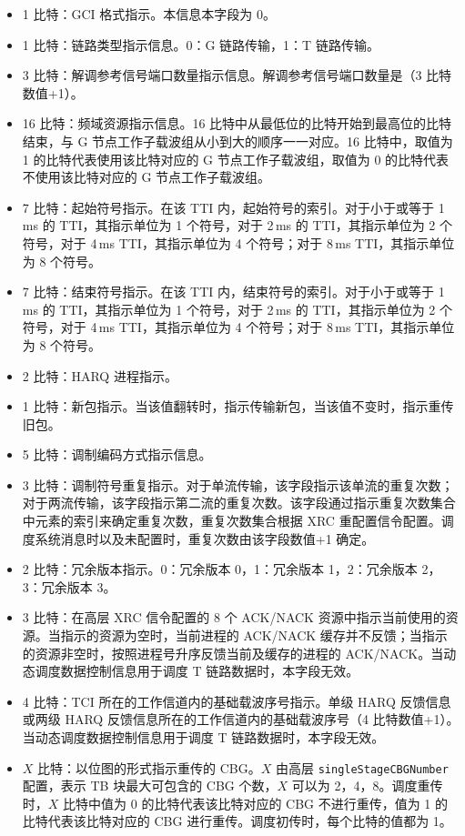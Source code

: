 \documentclass[11pt,a4paper]{ctexart}
\begin{document}
\begin{itemize}[nosep]
  \item 1 比特：GCI 格式指示。本信息本字段为 0。
  \item 1 比特：链路类型指示信息。0：G 链路传输，1：T 链路传输。
  \item 3 比特：解调参考信号端口数量指示信息。解调参考信号端口数量是（3 比特数值+1）。
  \item 16 比特：频域资源指示信息。16 比特中从最低位的比特开始到最高位的比特结束，与 G 节点工作子载波组从小到大的顺序一一对应。16 比特中，取值为 1 的比特代表使用该比特对应的 G 节点工作子载波组，取值为 0 的比特代表不使用该比特对应的 G 节点工作子载波组。
  \item 7 比特：起始符号指示。在该 TTI 内，起始符号的索引。对于小于或等于 1\,ms 的 TTI，其指示单位为 1 个符号，对于 2\,ms 的 TTI，其指示单位为 2 个符号，对于 4\,ms TTI，其指示单位为 4 个符号；对于 8\,ms TTI，其指示单位为 8 个符号。
  \item 7 比特：结束符号指示。在该 TTI 内，结束符号的索引。对于小于或等于 1\,ms 的 TTI，其指示单位为 1 个符号，对于 2\,ms 的 TTI，其指示单位为 2 个符号，对于 4\,ms TTI，其指示单位为 4 个符号；对于 8\,ms TTI，其指示单位为 8 个符号。
  \item 2 比特：HARQ 进程指示。
  \item 1 比特：新包指示。当该值翻转时，指示传输新包，当该值不变时，指示重传旧包。
  \item 5 比特：调制编码方式指示信息。
  \item 3 比特：调制符号重复指示。对于单流传输，该字段指示该单流的重复次数；对于两流传输，该字段指示第二流的重复次数。该字段通过指示重复次数集合中元素的索引来确定重复次数，重复次数集合根据 XRC 重配置信令配置。调度系统消息时以及未配置时，重复次数由该字段数值+1 确定。
  \item 2 比特：冗余版本指示。0：冗余版本 0，1：冗余版本 1，2：冗余版本 2，3：冗余版本 3。
  \item 3 比特：在高层 XRC 信令配置的 8 个 ACK/NACK 资源中指示当前使用的资源。当指示的资源为空时，当前进程的 ACK/NACK 缓存并不反馈；当指示的资源非空时，按照进程号升序反馈当前及缓存的进程的 ACK/NACK。当动态调度数据控制信息用于调度 T 链路数据时，本字段无效。
  \item 4 比特：TCI 所在的工作信道内的基础载波序号指示。单级 HARQ 反馈信息或两级 HARQ 反馈信息所在的工作信道内的基础载波序号（4 比特数值+1）。当动态调度数据控制信息用于调度 T 链路数据时，本字段无效。
  \item $X$ 比特：以位图的形式指示重传的 CBG。$X$ 由高层 \texttt{singleStageCBGNumber} 配置，表示 TB 块最大可包含的 CBG 个数，$X$ 可以为 2，4，8。调度重传时，$X$ 比特中值为 0 的比特代表该比特对应的 CBG 不进行重传，值为 1 的比特代表该比特对应的 CBG 进行重传。调度初传时，每个比特的值都为 1。

\end{itemize}
\end{document}
